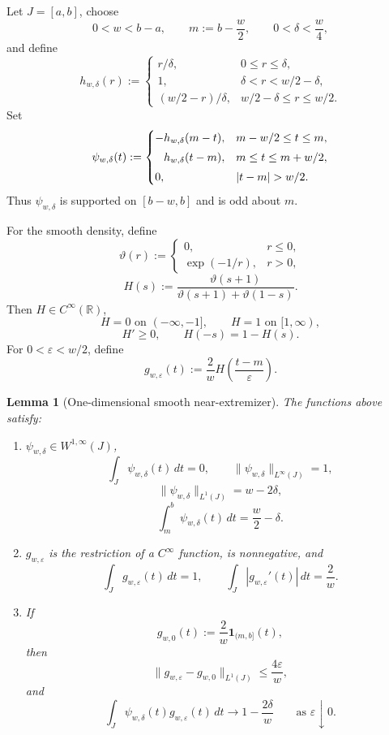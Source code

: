 \documentclass[11pt,letterpaper]{article}
\newtheorem{lemma}[theorem]{Lemma}
\theoremstyle{definition}
\theoremstyle{remark}
\begin{document}
Let $J=[a,b]$, choose
$$
0<w<b-a,
\qquad
m:=b-\frac w2,
\qquad
0<\delta<\frac w4,
$$
and define
$$
h_{w,\delta}(r)
:=
\begin{cases}
r/\delta, & 0\le r\le\delta,\\[1mm]
1, & \delta<r<w/2-\delta,\\[1mm]
(w/2-r)/\delta, & w/2-\delta\le r\le w/2.
\end{cases}
$$
Set
\begin{equation}
\label{eq:appendix_definition_psi_w_delta}
\psi_{w,\delta}(t)
:=
\begin{cases}
-h_{w,\delta}(m-t), & m-w/2\le t\le m,\\[1mm]
\hphantom{-}h_{w,\delta}(t-m), & m\le t\le m+w/2,\\[1mm]
0, & |t-m|>w/2.
\end{cases}
\end{equation}
Thus $\psi_{w,\delta}$ is supported on $[b-w,b]$ and is odd about $m$.

For the smooth density, define
$$
\vartheta(r)
:=
\begin{cases}
0, & r\le0,\\[1mm]
\exp(-1/r), & r>0,
\end{cases}
$$
$$
H(s)
:=
\frac{\vartheta(s+1)}
{\vartheta(s+1)+\vartheta(1-s)}.
$$
Then $H\in C^\infty(\mathbb R)$,
$$
H=0\text{ on }(-\infty,-1],
\qquad
H=1\text{ on }[1,\infty),
$$
$$
H'\ge0,
\qquad
H(-s)=1-H(s).
$$
For $0<\varepsilon<w/2$, define
\begin{equation}
\label{eq:appendix_definition_g_w_epsilon}
g_{w,\varepsilon}(t)
:=
\frac2wH\left(\frac{t-m}{\varepsilon}\right).
\end{equation}

\begin{lemma}[One-dimensional smooth near-extremizer]
\label{lem:appendix_one_dimensional_near_extremizer}
The functions above satisfy:

\begin{enumerate}
\item[\emph{(i)}]
$\psi_{w,\delta}\in W^{1,\infty}(J)$,
$$
\int_J\psi_{w,\delta}(t)\,dt=0,
\qquad
\|\psi_{w,\delta}\|_{L^\infty(J)}=1,
$$
\begin{equation}
\label{eq:appendix_psi_L1}
\|\psi_{w,\delta}\|_{L^1(J)}=w-2\delta,
\end{equation}
$$
\int_m^b\psi_{w,\delta}(t)\,dt
=\frac w2-\delta.
$$

\item[\emph{(ii)}]
$g_{w,\varepsilon}$ is the restriction of a $C^\infty$ function, is
nonnegative, and
$$
\int_Jg_{w,\varepsilon}(t)\,dt=1,
\qquad
\int_J|g_{w,\varepsilon}'(t)|\,dt=\frac2w.
$$

\item[\emph{(iii)}] If
$$
g_{w,0}(t):=\frac2w\mathbf 1_{(m,b]}(t),
$$
then
$$
\|g_{w,\varepsilon}-g_{w,0}\|_{L^1(J)}
\le
\frac{4\varepsilon}{w},
$$
and
\begin{equation}
\label{eq:appendix_one_dimensional_pairing_limit}
\int_J\psi_{w,\delta}(t)g_{w,\varepsilon}(t)\,dt
\longrightarrow
1-\frac{2\delta}{w}
\qquad
\text{as }\varepsilon\downarrow0.
\end{equation}
\end{enumerate}
\end{lemma}
\end{document}
